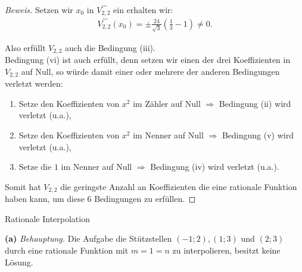 \documentclass[10pt]{article}
\newcommand{\beh}{\textit{Behauptung. }}
\newenvironment{Aufgabe}[2][Aufgabe]{\begin{trivlist}
\item[\hskip \labelsep {\bfseries #1}\hskip \labelsep {\bfseries #2.}]}{\end{trivlist}}
\begin{document}
\begin{proof}[Beweis]
    Setzen wir $x_0$ in $V_{2,2}^{\prime\prime\prime}$ ein erhalten wir:
    \begin{align*}
        V_{2,2}^{\prime\prime\prime}(x_0) = \pm \frac{24}{\sqrt{3}}\left(\frac{1}{3} - 1\right) \neq 0.
    \end{align*}

    Also erfüllt $V_{2,2}$ auch die Bedingung (iii). \\
    Bedingung (vi) ist auch erfüllt, denn setzen wir einen der drei Koeffizienten in $V_{2,2}$ auf Null, 
    so würde damit einer oder mehrere der anderen Bedingungen verletzt werden: 
    \begin{enumerate}
        \item[(1)] Setze den Koeffizienten von $x^2$ im Zähler auf Null $\Longrightarrow$ Bedingung (ii) wird verletzt (u.a.),
        \item[(2)] Setze den Koeffizienten von $x^2$ im Nenner auf Null $\Longrightarrow$ Bedingung (v) wird verletzt (u.a.),
        \item[(3)] Setze die $1$ im Nenner auf Null $\Longrightarrow$ Bedingung (iv) wird verletzt (u.a.).
    \end{enumerate}

    Somit hat $V_{2,2}$ die 
    geringste Anzahl an Koeffizienten die eine rationale Funktion haben kann, um diese 6 Bedingungen zu erfüllen.
\end{proof}


\begin{Aufgabe}{3}
    Rationale Interpolation
\end{Aufgabe}

\textbf{(a)} \beh Die Aufgabe die Stützstellen $(-1; 2), (1; 3)$ und $(2; 3)$ durch eine rationale Funktion
mit $m = 1 = n$ zu interpolieren, besitzt keine Lösung.
\end{document}
